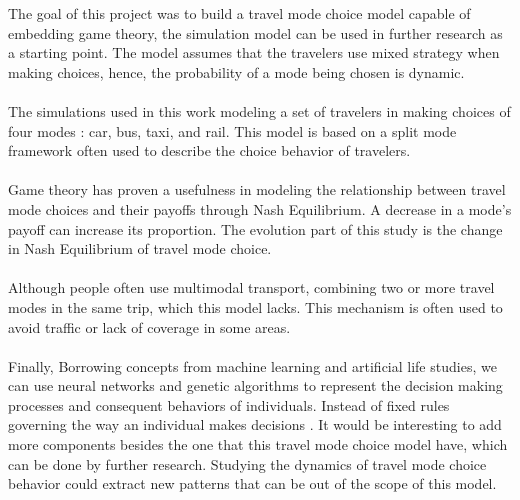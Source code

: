 The goal of this project was to build a travel mode choice model capable of embedding game theory, the simulation model can be used in further research as a starting point. The model assumes that the travelers use mixed strategy when making choices, hence, the probability of a mode being chosen is dynamic. \\

\paragraph{}
The simulations used in this work modeling a set of travelers in making choices of four modes : car, bus, taxi, and rail. This model is based on a split mode framework often used to describe the choice behavior of travelers.
\paragraph{}
Game theory has proven a usefulness in modeling the relationship between travel mode choices and their payoffs through Nash Equilibrium. A decrease in a mode's payoff can increase its proportion. The evolution part of this study is the change in Nash Equilibrium of travel mode choice.
\paragraph{}
Although people often use multimodal transport, combining two or more travel modes in the same trip, which this model lacks. This mechanism is often used to avoid traffic or lack of coverage in some areas.
\paragraph{}Finally, Borrowing concepts from machine learning and artificial life studies, we can use neural networks and genetic algorithms to represent the decision making processes and consequent behaviors of individuals. Instead of fixed rules governing the way an individual makes decisions . It would be interesting to add more components besides the one that this travel mode choice model have, which can be done by further research. Studying the dynamics of travel mode choice behavior could extract new patterns that can be out of the scope of this model.